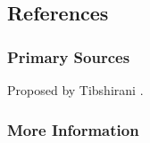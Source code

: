 \subsection{References}

\subsubsection{Primary Sources}

Proposed by Tibshirani \cite{Tibshirani1996}.

\subsubsection{More Information}



